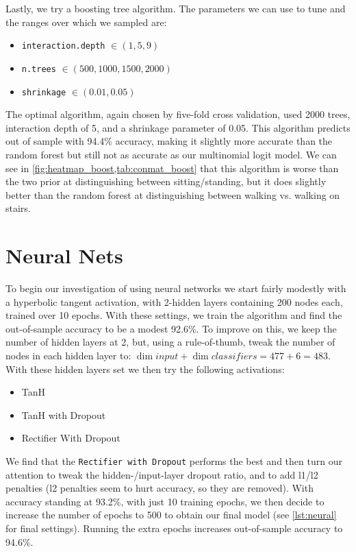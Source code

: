Lastly, we try a boosting tree algorithm. The parameters we can use to tune and the ranges over which we sampled are:
\begin{itemize}
\item \texttt{interaction.depth} $\in (1, 5, 9)$
\item \texttt{n.trees} $\in (500, 1000, 1500, 2000)$
\item \texttt{shrinkage} $\in (0.01, 0.05)$
\end{itemize}
The optimal algorithm, again chosen by five-fold cross validation, used 2000 trees, interaction depth of 5, and a shrinkage parameter of 0.05. This algorithm predicts out of sample with 94.4\% accuracy, making it slightly more accurate than the random forest but still not as accurate as our multinomial logit model. We can see in \vref{fig:heatmap_boost,tab:conmat_boost} that this algorithm is worse than the two prior at distinguishing between sitting/standing, but it does slightly better than the random forest at distinguishing between walking vs. walking on stairs.

\section{Neural Nets} \label{sec:nnets}
To begin our investigation of using neural networks we start fairly modestly with a hyperbolic tangent activation, with 2-hidden layers containing 200 nodes each, trained over 10 epochs.  With these settings, we train the algorithm and find the out-of-sample accuracy to be a modest 92.6\%.  To improve on this, we keep the number of hidden layers at 2, but, using a rule-of-thumb, tweak the number of nodes in each hidden layer to: $\dim input + \dim classifiers = 477 + 6 = 483$.  With these hidden layers set we then try the following activations:
\begin{itemize}
\item TanH
\item TanH with Dropout
\item Rectifier With Dropout
\end{itemize}

We find that the \texttt{Rectifier with Dropout} performs the best and then turn our attention to tweak the hidden-/input-layer dropout ratio, and to add l1/l2 penalties (l2 penalties seem to hurt accuracy, so they are removed).  With accuracy standing at 93.2\%, with just 10 training epochs, we then decide to increase the number of epochs to 500 to obtain our final model (see \cref{lst:neural} for final settings).  Running the extra epochs increases out-of-sample accuracy to 94.6\%.

